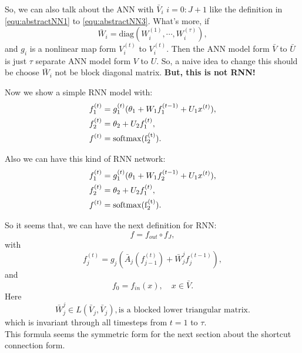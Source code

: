 So, we can also talk about the ANN with $\bar{V}_i$ $i = 0:J+1$ like the definition in \ref{equ:abstractNN1} to \ref{equ:abstractNN3}. What's more, if 
\begin{equation}
\bar{W}_i = \text{diag}(W^{(1)}_i, \cdots, W_i^{(\tau)}),
\end{equation}
and $g_i$ is a nonlinear map form $V_i^{(t)}$ to $V_i^{(t)}$. Then the ANN model form $\bar{V}$ to $\bar{U}$ is just $\tau$ separate ANN model form $V$ to $U$. So, a naive idea to change this should be choose $\bar{W}_i$ not be block diagonal matrix. {\bf{But, this is not RNN!}}

Now we show a simple RNN model with:
\begin{align}
f_{1}^{(t)} &= g_1^{(t)}(\theta_1 + W_1f_1^{(t-1)} + U_1x^{(t)}), \\
f_{2}^{(t)} &= \theta_2 + U_2f_{1}^{(t)}, \\
f^{(t)} &= \rm{softmax}(f_2^{(t)}).
\end{align}

Also we can have this kind of RNN network:
\begin{align}
f_{1}^{(t)} &= g_1^{(t)}(\theta_1 + W_1f_2^{(t-1)} + U_1x^{(t)}), \\
f_{2}^{(t)} &= \theta_2 + U_2f_{1}^{(t)}, \\
f^{(t)} &= \rm{softmax}(f_2^{(t)}).
\end{align}

So it seems that, we can have the next definition for RNN:
\begin{equation}\label{equ:abstractRNN1}
f = f_{out}\circ f_J,
\end{equation}
with
\begin{equation}\label{equ:abstractRNN2}
f^{(t)}_j = g_j(\bar{A}_j(f^{(t)}_{j-1}) + \bar{W}_{j}^j f^{(t-1)}_{j}),
\end{equation}
and
\begin{equation}\label{equ:abstractRNN3}
f_0 = f_{in}(x), \quad x \in \bar{V}.
\end{equation}
Here 
\begin{equation}
\bar{W}_j^{j} \in L(\bar{V}_j, \bar{V}_j), \text{is a blocked lower triangular matrix}.
\end{equation}
which is invariant through all timesteps from $t=1$ to $\tau$. \\
This formula seems the symmetric form for the next section about the shortcut connection form.
